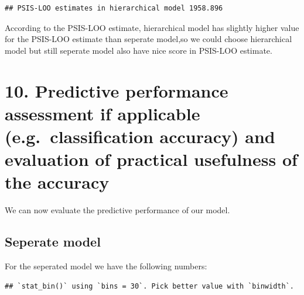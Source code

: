 \documentclass[
]{article}
\newenvironment{Shaded}{\begin{snugshade}}{\end{snugshade}}
\newcommand{\AttributeTok}[1]{\textcolor[rgb]{0.77,0.63,0.00}{#1}}
\newcommand{\DecValTok}[1]{\textcolor[rgb]{0.00,0.00,0.81}{#1}}
\newcommand{\FunctionTok}[1]{\textcolor[rgb]{0.00,0.00,0.00}{#1}}
\newcommand{\NormalTok}[1]{#1}
\newcommand{\SpecialCharTok}[1]{\textcolor[rgb]{0.00,0.00,0.00}{#1}}
\newcommand{\StringTok}[1]{\textcolor[rgb]{0.31,0.60,0.02}{#1}}
\begin{document}
\begin{verbatim}
## PSIS-LOO estimates in hierarchical model 1958.896
\end{verbatim}

According to the PSIS-LOO estimate, hierarchical model has slightly
higher value for the PSIS-LOO estimate than seperate model,so we could
choose hierarchical model but still seperate model also have nice score
in PSIS-LOO estimate.

\hypertarget{predictive-performance-assessment-if-applicable-e.g.-classification-accuracy-and-evaluation-of-practical-usefulness-of-the-accuracy}{%
\section{10. Predictive performance assessment if applicable
(e.g.~classification accuracy) and evaluation of practical usefulness of
the
accuracy}\label{predictive-performance-assessment-if-applicable-e.g.-classification-accuracy-and-evaluation-of-practical-usefulness-of-the-accuracy}}

We can now evaluate the predictive performance of our model.

\hypertarget{seperate-model-1}{%
\subsection{Seperate model}\label{seperate-model-1}}

For the seperated model we have the following numbers:

\begin{Shaded}
\end{Shaded}

\begin{verbatim}
## `stat_bin()` using `bins = 30`. Pick better value with `binwidth`.
\end{verbatim}
\end{document}
